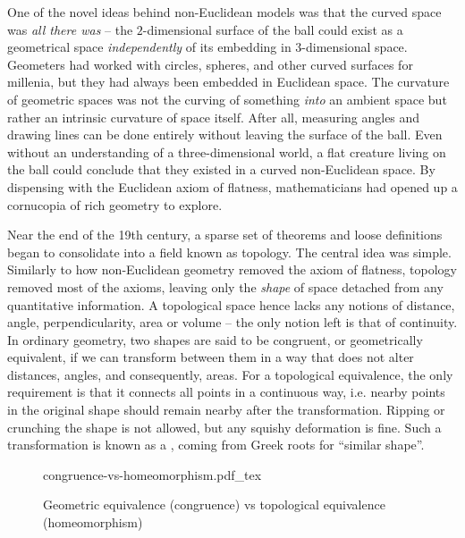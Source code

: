 One of the novel ideas behind non-Euclidean models was that the curved space was \emph{all there was} -- the $2$-dimensional surface of the ball could exist as a geometrical space \emph{independently} of its embedding in $3$-dimensional space.
Geometers had worked with circles, spheres, and other curved surfaces for millenia, but they had always been embedded in Euclidean space.
The curvature of geometric spaces was not the curving of something \emph{into} an ambient space but rather an intrinsic curvature of space itself. After all, measuring angles and drawing lines can be done entirely without leaving the surface of the ball. Even without an understanding of a three-dimensional world, a flat creature living on the ball could conclude that they existed in a curved non-Euclidean space.
By dispensing with the Euclidean axiom of flatness, mathematicians had opened up a cornucopia of rich geometry to explore.
%

Near the end of the 19th century, a sparse set of theorems and loose definitions began to consolidate into a field known as topology. The central idea was simple. Similarly to how non-Euclidean geometry removed the axiom of flatness, topology removed most of the axioms, leaving only the \emph{shape} of space detached from any quantitative information.
A topological space hence lacks any notions of distance, angle, perpendicularity, area or volume -- the only notion left is that of continuity.
In ordinary geometry, two shapes are said to be congruent, or geometrically equivalent, if we can transform between them in a way that does not alter distances, angles, and consequently, areas.
For a topological equivalence, the only requirement is that it connects all points in a continuous way, i.e. nearby points in the original shape should remain nearby after the transformation. Ripping or crunching the shape is not allowed, but any squishy deformation is fine. Such a transformation is known as a , coming from Greek roots for ``similar shape''.
\begin{figure}[ht]
	\centering
	{congruence-vs-homeomorphism.pdf_tex}
	\caption{Geometric equivalence (congruence) vs topological equivalence (homeomorphism)}\label{fig:first}
\end{figure}

